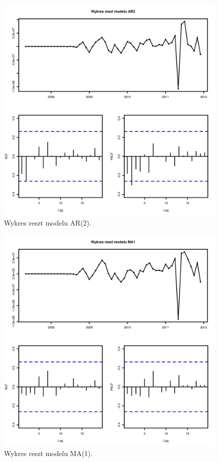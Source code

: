 \documentclass[11pt]{article}
\begin{document}
\newpage

\begin{figure}[h]
    \centering
	\includegraphics[width=\textwidth]{images/train_monthly_train_AR2_reszty.png}
    \caption{Wykres reszt modelu AR(2).}
    \label{fig:train_monthly_train_AR2_reszty}

\end{figure}

\newpage

\begin{figure}[h]
    \centering
	\includegraphics[width=\textwidth]{images/train_monthly_train_MA1_reszty.png}
    \caption{Wykres reszt modelu MA(1).}
    \label{fig:train_monthly_train_MA1_reszty}

\end{figure}
\end{document}
